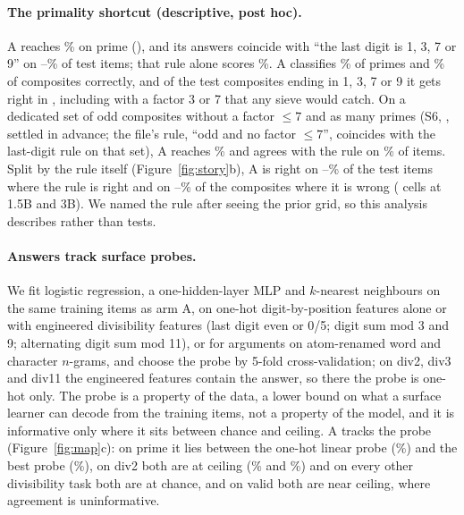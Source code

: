 \documentclass{article}
\theoremstyle{definition}
\begin{document}
\paragraph{The primality shortcut (descriptive, post hoc).} A reaches \primeA\% on prime (\primeASeeds), and its answers coincide with ``the last digit is 1, 3, 7 or 9'' on \primeAagreeLastDigitLo--\primeAagreeLastDigitHi\% of test items; that rule alone scores \%. A classifies \primeAprimesCorrect\% of primes and \primeAcompCorrect\% of composites correctly, and of the \primeCompLastDigitN{} test composites ending in 1, 3, 7 or 9 it gets \primeCompLastDigitA{} right in \primeASeeds, including \primeCompThreeSevenN{} with a factor 3 or 7 that any sieve would catch. On a dedicated set of \primeHardNneg{} odd composites without a factor $\le 7$ and as many primes (S6, \verdictSSix, settled in advance; the file's rule, ``odd and no factor $\le7$'', coincides with the last-digit rule on that set), A reaches \primeHardA\% and agrees with the rule on \primeHardAagree\% of items. Split by the rule itself (Figure~\ref{fig:story}b), A is right on \storyPrimeAconsLo--\storyPrimeAconsHi\% of the \storyPrimeRuleRightN{} test items where the rule is right and on \storyPrimeAinconsLo--\storyPrimeAinconsHi\% of the \storyPrimeRuleWrongN{} composites where it is wrong (\storyPrimeAcells{} cells at 1.5B and 3B). We named the rule after seeing the prior grid, so this analysis describes rather than tests.

\paragraph{Answers track surface probes.} We fit logistic regression, a one-hidden-layer MLP and $k$-nearest neighbours on the same \nTrain{} training items as arm A, on \nProbeFeatures{} one-hot digit-by-position features alone or with engineered divisibility features (last digit even or 0/5; digit sum mod 3 and 9; alternating digit sum mod 11), or for arguments on atom-renamed word and character $n$-grams, and choose the probe by 5-fold cross-validation; on div2, div3 and div11 the engineered features contain the answer, so there the probe is one-hot only. The probe is a property of the data, a lower bound on what a surface learner can decode from the training items, not a property of the model, and it is informative only where it sits between chance and ceiling. A tracks the probe (Figure~\ref{fig:map}c): on prime it lies between the one-hot linear probe (\primeProbeOneHot\%) and the best probe (\primeProbe\%), on div2 both are at ceiling (\divtwoA\% and \divtwoProbe\%) and on every other divisibility task both are at chance, and on valid both are near ceiling, where agreement is uninformative.
\end{document}
